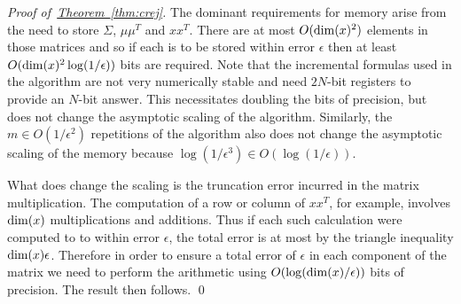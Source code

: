 \documentclass[twoside]{article}
\newenvironment{proofof}[1]{\begin{trivlist}\item[]{\flushleft\it
Proof of~#1.}}
{\qed\end{trivlist}}
\newcommand{\thm}[1]{\hyperref[thm:#1]{Theorem~\ref*{thm:#1}}}
\begin{document}
\begin{proofof}{\thm{crej}}
The dominant requirements for memory arise from the need to store $\Sigma$, $\mu\mu^T$ and $xx^T$.  There are at most $O({\rm dim}(x)^2)$ elements in those matrices and so if each is to be stored within error $\epsilon$ then at least $O({\rm dim}(x)^2\log(1/\epsilon))$ bits are required.  Note that the incremental formulas used in the algorithm are not very numerically stable and need $2N$-bit registers to provide an $N$-bit answer.  This necessitates doubling the bits of precision, but does not change the asymptotic scaling of the algorithm.  Similarly, the $m\in O(1/\epsilon^2)$ repetitions of the algorithm also does not change the asymptotic scaling of the memory because $\log(1/\epsilon^3) \in O(\log(1/\epsilon))$.

What does change the scaling is the truncation error incurred in the matrix multiplication.  The computation of a row or column of $xx^T$, for example, involves ${\rm dim}(x)$ multiplications and additions.  Thus if each such calculation were computed to to within error $\epsilon$, the total error is at most by the triangle inequality ${\rm dim}(x) \epsilon$.  Therefore in order to ensure a total error of $\epsilon$ in each component of the matrix we need to perform the arithmetic using $O(\log({\rm dim}(x)/\epsilon))$ bits of precision.  The result then follows.
\end{proofof}
\end{document}
